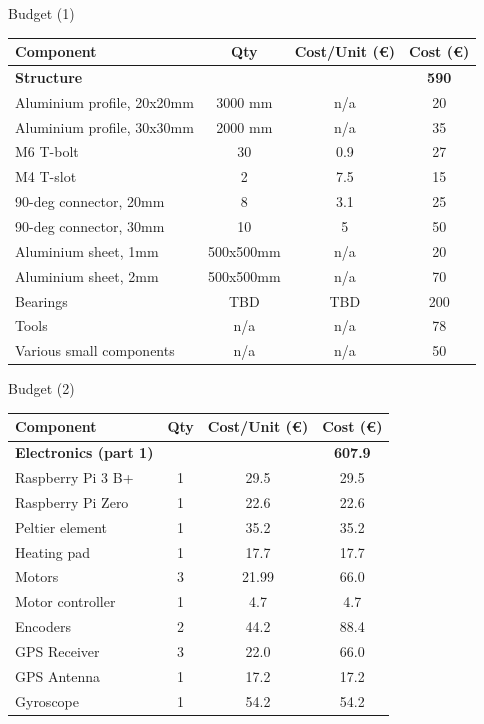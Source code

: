 \documentclass[11pt, aspectratio=169]{beamer}
\begin{document}
\begin{frame}{Budget (1)}
    \centering
    \begin{tabular}{|l|c|c|c|} 
        \hline
        Component & Qty & Cost/Unit (\euro) & Cost (\euro)  \\ 
        \hline
        \rowcolor{Gray}
        \textbf{Structure} &  &  & \textbf{590}  \\
        Aluminium profile, 20x20mm & 3000 mm & n/a & 20  \\
        Aluminium profile, 30x30mm & 2000 mm & n/a & 35  \\
        M6 T-bolt & 30 & 0.9 & 27  \\
        M4 T-slot & 2 & 7.5 & 15  \\
        90-deg connector, 20mm & 8 & 3.1 & 25 \\
        90-deg connector, 30mm & 10 & 5 & 50 \\
        Aluminium sheet, 1mm & 500x500mm & n/a & 20 \\
        Aluminium sheet, 2mm & 500x500mm & n/a & 70 \\
        Bearings & TBD & TBD & 200 \\
        Tools & n/a & n/a & 78 \\
        Various small components & n/a & n/a & 50  \\
        \hline
    \end{tabular}
\end{frame}
\begin{frame}{Budget (2)}
    \centering
    \begin{tabular}{|l|c|c|c|} 
        \hline
        Component & Qty & Cost/Unit (\euro) & Cost (\euro)  \\ 
        \hline
        \rowcolor{Gray}
        \textbf{Electronics (part 1)} &  &  & \textbf{607.9}  \\ 
        Raspberry Pi 3 B+ & 1 & 29.5 & 29.5  \\
        Raspberry Pi Zero & 1 & 22.6 & 22.6  \\
        Peltier element & 1 & 35.2 & 35.2  \\
        Heating pad & 1 & 17.7 & 17.7  \\ 
        Motors & 3 & 21.99 & 66.0  \\ 
        Motor controller & 1 & 4.7 & 4.7  \\
        Encoders & 2 & 44.2 & 88.4  \\
        GPS Receiver & 3 & 22.0 & 66.0  \\ 
        GPS Antenna & 1 & 17.2 & 17.2  \\
        Gyroscope & 1 & 54.2 & 54.2  \\
        \hline
    \end{tabular}
\end{frame}
\end{document}
